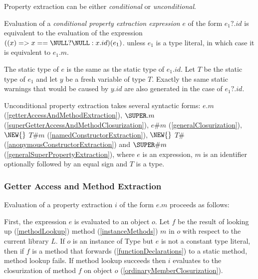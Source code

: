 \documentclass{article}
\newcommand{\code}[1]{{\sf #1}}
\begin{document}

Property extraction can be either {\em conditional} or {\em unconditional}.


Evaluation of a {\em conditional property extraction expression} $e$ of the form $e_1?.id$  is equivalent to the evaluation of the expression  $((x) => x == \NULL ? \NULL : x.id)(e_1)$. 
unless $e_1$ is  a type literal, in which case it is equivalent to $e_1.m$.

The static type of $e$ is the same as the static type of $e_1.id$. Let $T$ be the static type of $e_1$ and let $y$ be a fresh variable of type $T$. Exactly the same static warnings that would be caused by $y.id$ are also generated in the case of $e_1?.id$.

\LMHash{}
Unconditional property extraction takes several syntactic forms: $e.m$ (\ref{getterAccessAndMethodExtraction}), $\SUPER.m$ (\ref{superGetterAccessAndMethodClosurization}), $e\#m$ (\ref{generalClosurization}), $\NEW{}$ $T\#m$ (\ref{namedConstructorExtraction}), $\NEW{}$ $T\#$ (\ref{anonymousConstructorExtraction}) and $\SUPER\#m$ (\ref{generalSuperPropertyExtraction}), where $e$ is an expression, $m$ is an identifier optionally followed by an equal sign and $T$ is a type.

\subsubsection{Getter Access and Method Extraction}

\LMHash{}
Evaluation of a property extraction $i$ of the form $e.m$ proceeds as follows:

\LMHash{}
First, the expression $e$ is evaluated to an object $o$. Let $f$ be the result of looking up (\ref{methodLookup}) method  (\ref{instanceMethods}) $m$ in $o$ with respect to the current library $L$.  If $o$ is an instance of \code{Type} but $e$ is not a constant type literal, then if $f$ is a method that forwards (\ref{functionDeclarations}) to a static method,  method lookup fails. If method lookup succeeds then $i$ evaluates to the closurization of method $f$ on object $o$ (\ref{ordinaryMemberClosurization}).  
\end{document}
